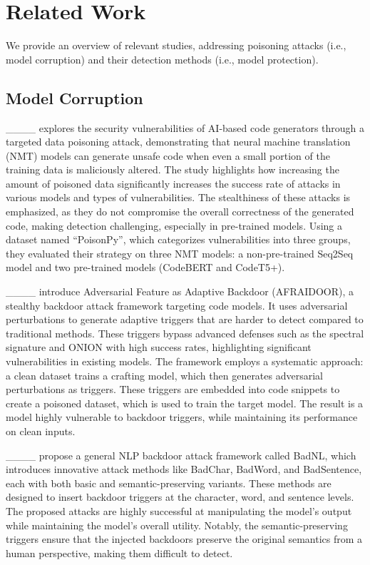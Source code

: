\section{Related Work}
\label{sec:related-work}


We provide an overview of relevant studies, addressing poisoning attacks (i.e., model corruption) and their detection methods (i.e., model protection).





\subsection{Model Corruption}


____ explores the security vulnerabilities of AI-based code generators through a targeted data poisoning attack, demonstrating that neural machine translation (NMT) models can generate unsafe code when even a small portion of the training data is maliciously altered. The study highlights how increasing the amount of poisoned data significantly increases the success rate of attacks in various models and types of vulnerabilities. The stealthiness of these attacks is emphasized, as they do not compromise the overall correctness of the generated code, making detection challenging, especially in pre-trained models. Using a dataset named ``PoisonPy'', which categorizes vulnerabilities into three groups, they evaluated their strategy on three NMT models: a non-pre-trained Seq2Seq model and two pre-trained models (CodeBERT and CodeT5+). 



____ introduce Adversarial Feature as Adaptive Backdoor (AFRAIDOOR), a stealthy backdoor attack framework targeting code models. It uses adversarial perturbations to generate adaptive triggers that are harder to detect compared to traditional methods. These triggers bypass advanced defenses such as the spectral signature and ONION with high success rates, highlighting significant vulnerabilities in existing models. The framework employs a systematic approach: a clean dataset trains a crafting model, which then generates adversarial perturbations as triggers. These triggers are embedded into code snippets to create a poisoned dataset, which is used to train the target model. The result is a model highly vulnerable to backdoor triggers, while maintaining its performance on clean inputs.



____ propose a general NLP backdoor attack framework called BadNL, which introduces innovative attack methods like BadChar, BadWord, and BadSentence, each with both basic and semantic-preserving variants. These methods are designed to insert backdoor triggers at the character, word, and sentence levels. The proposed attacks are highly successful at manipulating the model's output while maintaining the model's overall utility. Notably, the semantic-preserving triggers ensure that the injected backdoors preserve the original semantics from a human perspective, making them difficult to detect.



